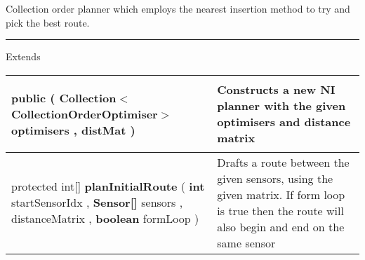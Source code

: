  {\scriptsize Collection order planner which employs the nearest insertion method to try and pick the best route.
 
\vspace*{4pt} \hrule \vspace*{3pt}
Extends \textbf{ \hyperref[tab:BaseCollectionOrderPlanner]{\color{blue}{BaseCollectionOrderPlanner}} }
\vspace*{-5pt} 
\begin{tabularx}{\linewidth}{m{}|m{}}
\label{tab:NearestInsertionCollectionOrderPlanner}
\begin{raggedleft}public  \textbf{\hyperref[tab:NearestInsertionCollectionOrderPlanner]{\color{blue}{NearestInsertionCollectionOrderPlanner}} }(\newline \hfill 
\hspace*{ 5pt} \textbf{Collection$<$CollectionOrderOptimiser$>$} optimisers , \newline
 \hspace*{ 5pt} \textbf{\hyperref[tab:DistanceMatrix]{\color{blue}{DistanceMatrix}}} distMat  )
\end{raggedleft} &
 Constructs a new NI planner with the given optimisers and distance matrix\\ \hline 
\begin{raggedleft}protected int{[}{]} \textbf{planInitialRoute }(\newline \hfill 
\hspace*{ 5pt} \textbf{int} startSensorIdx , \newline
 \hspace*{ 5pt} \textbf{Sensor{[}{]}} sensors , \newline
 \hspace*{ 5pt} \textbf{\hyperref[tab:DistanceMatrix]{\color{blue}{DistanceMatrix}}} distanceMatrix , \newline
 \hspace*{ 5pt} \textbf{boolean} formLoop  )
\end{raggedleft} &
 Drafts a route between the given sensors, using the given matrix. If form loop is true then the route will also begin and end on the same sensor\\\end{tabularx}
}
